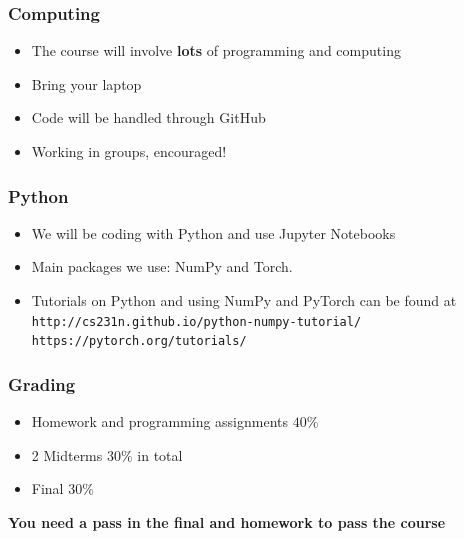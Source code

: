 \documentclass[12pt,fleqn]{beamer}
\begin{document}
\begin{frame}
\frametitle{Computing}

\begin{itemize}
\item The course will involve {\bf lots} of programming and computing
\item Bring your laptop
\item Code will be handled through GitHub
\item Working in groups, encouraged!
\end{itemize}

\end{frame}

\begin{frame}
\frametitle{Python}

\begin{itemize}
\item We will be coding with Python and use Jupyter Notebooks
\item Main packages we use: NumPy and Torch.
\item Tutorials on Python and using NumPy and PyTorch can be found at \\
{\tt http://cs231n.github.io/python-numpy-tutorial/} \\
{\tt https://pytorch.org/tutorials/}
\end{itemize}

\end{frame}


\begin{frame}
\frametitle{Grading}

\begin{itemize}
\item Homework and programming assignments $40\%$
\item 2 Midterms $30\%$ in total
\item Final $30\%$ 
\end{itemize}

{\bf You need a pass in the final and homework to pass the course}



\end{frame}
\end{document}
